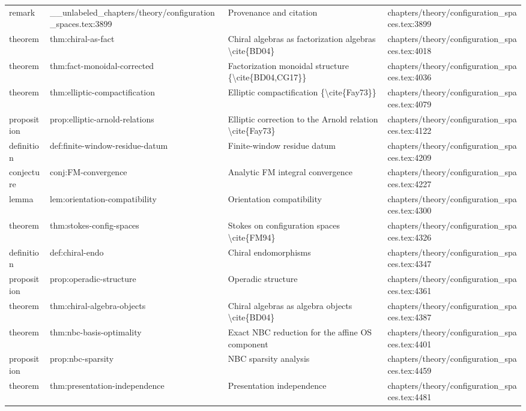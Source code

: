 \documentclass[11pt]{article}
\begin{document}
\begin{longtable}{L{0.10\textwidth}L{0.26\textwidth}L{0.42\textwidth}L{0.22\textwidth}}
remark & \_\_unlabeled\_chapters/theory/configuration\_spaces.tex:3899 & Provenance and citation & chapters/theory/configuration\_spaces.tex:3899\\
theorem & thm:chiral-as-fact & Chiral algebras as factorization algebras \textbackslash{}cite\{BD04\} & chapters/theory/configuration\_spaces.tex:4018\\
theorem & thm:fact-monoidal-corrected & Factorization monoidal structure \{\textbackslash{}cite\{BD04,CG17\}\} & chapters/theory/configuration\_spaces.tex:4036\\
theorem & thm:elliptic-compactification & Elliptic compactification \{\textbackslash{}cite\{Fay73\}\} & chapters/theory/configuration\_spaces.tex:4079\\
proposition & prop:elliptic-arnold-relations & Elliptic correction to the Arnold relation \textbackslash{}cite\{Fay73\} & chapters/theory/configuration\_spaces.tex:4122\\
definition & def:finite-window-residue-datum & Finite-window residue datum & chapters/theory/configuration\_spaces.tex:4209\\
conjecture & conj:FM-convergence & Analytic FM integral convergence & chapters/theory/configuration\_spaces.tex:4227\\
lemma & lem:orientation-compatibility & Orientation compatibility & chapters/theory/configuration\_spaces.tex:4300\\
theorem & thm:stokes-config-spaces & Stokes on configuration spaces \textbackslash{}cite\{FM94\} & chapters/theory/configuration\_spaces.tex:4326\\
definition & def:chiral-endo & Chiral endomorphisms & chapters/theory/configuration\_spaces.tex:4347\\
proposition & prop:operadic-structure & Operadic structure & chapters/theory/configuration\_spaces.tex:4361\\
theorem & thm:chiral-algebra-objects & Chiral algebras as algebra objects \textbackslash{}cite\{BD04\} & chapters/theory/configuration\_spaces.tex:4387\\
theorem & thm:nbc-basis-optimality & Exact NBC reduction for the affine OS component & chapters/theory/configuration\_spaces.tex:4401\\
proposition & prop:nbc-sparsity & NBC sparsity analysis & chapters/theory/configuration\_spaces.tex:4459\\
theorem & thm:presentation-independence & Presentation independence & chapters/theory/configuration\_spaces.tex:4481\\

\end{longtable}
\end{document}
